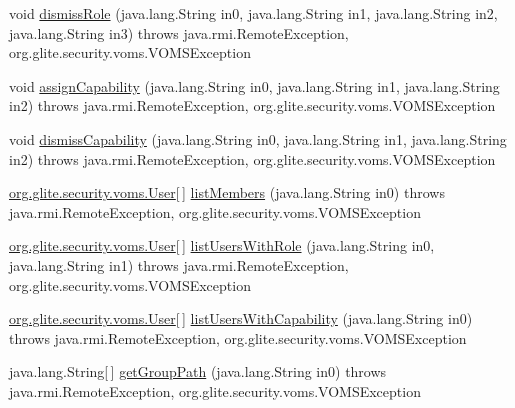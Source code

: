 \begin{DoxyCompactItemize}
\item 
void \hyperlink{classorg_1_1glite_1_1security_1_1voms_1_1service_1_1admin_1_1VOMSAdminSoapBindingStub_ac9ec0d470764c2f8617e4424e9c1805f}{dismissRole} (java.lang.String in0, java.lang.String in1, java.lang.String in2, java.lang.String in3)  throws java.rmi.RemoteException, org.glite.security.voms.VOMSException 
\item 
void \hyperlink{classorg_1_1glite_1_1security_1_1voms_1_1service_1_1admin_1_1VOMSAdminSoapBindingStub_a090f11cbb69289d8e517cd37e4685f61}{assignCapability} (java.lang.String in0, java.lang.String in1, java.lang.String in2)  throws java.rmi.RemoteException, org.glite.security.voms.VOMSException 
\item 
void \hyperlink{classorg_1_1glite_1_1security_1_1voms_1_1service_1_1admin_1_1VOMSAdminSoapBindingStub_a6ffc6d35ae8c59b0acfe803173e6f1ca}{dismissCapability} (java.lang.String in0, java.lang.String in1, java.lang.String in2)  throws java.rmi.RemoteException, org.glite.security.voms.VOMSException 
\item 
\hyperlink{classorg_1_1glite_1_1security_1_1voms_1_1User}{org.glite.security.voms.User}\mbox{[}$\,$\mbox{]} \hyperlink{classorg_1_1glite_1_1security_1_1voms_1_1service_1_1admin_1_1VOMSAdminSoapBindingStub_ae13491ca3918fda38e6cba6afb4ba38b}{listMembers} (java.lang.String in0)  throws java.rmi.RemoteException, org.glite.security.voms.VOMSException 
\item 
\hyperlink{classorg_1_1glite_1_1security_1_1voms_1_1User}{org.glite.security.voms.User}\mbox{[}$\,$\mbox{]} \hyperlink{classorg_1_1glite_1_1security_1_1voms_1_1service_1_1admin_1_1VOMSAdminSoapBindingStub_acf29f3d7382f7f0335ef6b1d63fdf3fa}{listUsersWithRole} (java.lang.String in0, java.lang.String in1)  throws java.rmi.RemoteException, org.glite.security.voms.VOMSException 
\item 
\hyperlink{classorg_1_1glite_1_1security_1_1voms_1_1User}{org.glite.security.voms.User}\mbox{[}$\,$\mbox{]} \hyperlink{classorg_1_1glite_1_1security_1_1voms_1_1service_1_1admin_1_1VOMSAdminSoapBindingStub_a78cfe9839c3f81d266504b4815316178}{listUsersWithCapability} (java.lang.String in0)  throws java.rmi.RemoteException, org.glite.security.voms.VOMSException 
\item 
java.lang.String\mbox{[}$\,$\mbox{]} \hyperlink{classorg_1_1glite_1_1security_1_1voms_1_1service_1_1admin_1_1VOMSAdminSoapBindingStub_a1792b01910980b60b7c1ccb984bf1128}{getGroupPath} (java.lang.String in0)  throws java.rmi.RemoteException, org.glite.security.voms.VOMSException 
\item 

\end{DoxyCompactItemize}
